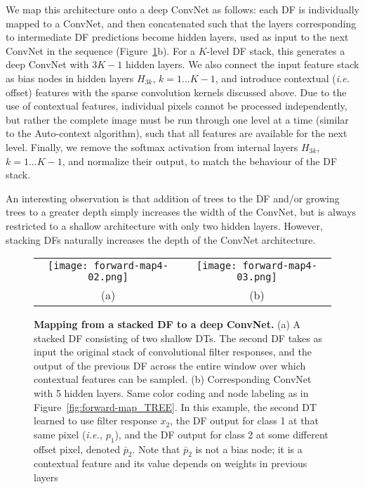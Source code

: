 \documentclass[twocolumn]{svjour3}
\begin{document}
We map this architecture onto a deep ConvNet as follows: each DF is individually mapped to a ConvNet, and then concatenated such that the layers corresponding to intermediate DF predictions become hidden layers, used as input to the next ConvNet in the sequence (Figure~\ref{fig:forward-map}b).
For a $K$-level DF stack, this generates a deep ConvNet with $3K-1$ hidden layers.
We also connect the input feature stack as bias nodes in hidden layers $H_{3k}$, $k = 1...K-1$, and introduce contextual (\emph{i.e.} offset) features with the sparse convolution kernels discussed above.
Due to the use of contextual features, individual pixels cannot be processed independently, but rather the complete image must be run through one level at a time (similar to the Auto-context algorithm), such that all features are available for the next level.
Finally, we remove the softmax activation from internal layers $H_{3k}$, $k = 1...K-1$, and normalize their output, to match the behaviour of the DF stack.

An interesting observation is that addition of trees to the DF and/or growing trees to a greater depth simply increases the width of the ConvNet, but is always restricted to a shallow architecture with only two hidden layers.
However, stacking DFs naturally increases the depth of the ConvNet architecture.


\begin{figure*}[htp!]
	\begin{center}
		\begin{tabular}{cc}
		
   		 	\texttt{[image: forward-map4-02.png]} &
   			\texttt{[image: forward-map4-03.png]} \\
				   (a) & (b)
		\end{tabular}
	\end{center}
    \caption{\textbf{Mapping from a stacked DF to a deep ConvNet.} (a) A stacked DF consisting of two shallow DTs. The second DF takes as input the original stack of convolutional filter responses, and the output of the previous DF across the entire window over which contextual features can be sampled. (b) Corresponding ConvNet with 5 hidden layers. Same color coding and node labeling as in Figure~\ref{fig:forward-map_TREE}.
In this example, the second DT learned to use filter response $x_2$, the DF output for class 1 at that same pixel (\emph{i.e.,} $p_1$), and the DF output for class 2 at some different offset pixel, denoted $\bar{p}_2$. Note that $\bar{p}_2$ is not a bias node; it is a contextual feature and its value depends on weights in previous layers}
	\label{fig:forward-map}
\end{figure*}
\end{document}
